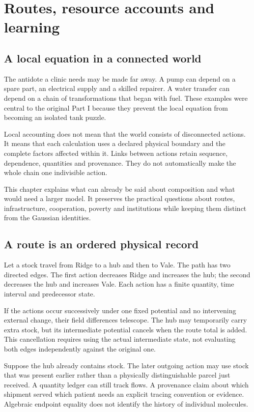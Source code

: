 \chapter{Routes, resource accounts and learning}\label{ch:routes}

\section{A local equation in a connected world}
The antidote a clinic needs may be made far away. A pump can depend on a spare part, an electrical supply and a skilled repairer. A water transfer can depend on a chain of transformations that began with fuel. These examples were central to the original Part I because they prevent the local equation from becoming an isolated tank puzzle.

Local accounting does not mean that the world consists of disconnected actions. It means that each calculation uses a declared physical boundary and the complete factors affected within it. Links between actions retain sequence, dependence, quantities and provenance. They do not automatically make the whole chain one indivisible action.

This chapter explains what can already be said about composition and what would need a larger model. It preserves the practical questions about routes, infrastructure, cooperation, poverty and institutions while keeping them distinct from the Gaussian identities.

\section{A route is an ordered physical record}
Let a stock travel from Ridge to a hub and then to Vale. The path has two directed edges. The first action decreases Ridge and increases the hub; the second decreases the hub and increases Vale. Each action has a finite quantity, time interval and predecessor state.

If the actions occur successively under one fixed potential and no intervening external change, their field differences telescope. The hub may temporarily carry extra stock, but its intermediate potential cancels when the route total is added. This cancellation requires using the actual intermediate state, not evaluating both edges independently against the original one.

Suppose the hub already contains stock. The later outgoing action may use stock that was present earlier rather than a physically distinguishable parcel just received. A quantity ledger can still track flows. A provenance claim about which shipment served which patient needs an explicit tracing convention or evidence. Algebraic endpoint equality does not identify the history of individual molecules.

